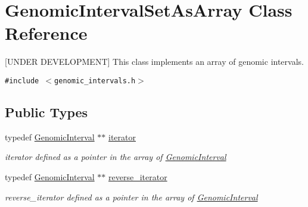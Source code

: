 \hypertarget{classGenomicIntervalSetAsArray}{
\section{GenomicIntervalSetAsArray Class Reference}
\label{classGenomicIntervalSetAsArray}
}
\mbox{[}UNDER DEVELOPMENT\mbox{]} This class implements an array of genomic intervals.  


{\tt \#include $<$genomic\_\-intervals.h$>$}

\subsection*{Public Types}
\begin{CompactItemize}
\item 
\hypertarget{classGenomicIntervalSetAsArray_1a0416c9fac7e9d965ae7fe84f1649c2}{
typedef \hyperlink{classGenomicInterval}{GenomicInterval} $\ast$$\ast$ \hyperlink{classGenomicIntervalSetAsArray_1a0416c9fac7e9d965ae7fe84f1649c2}{iterator}}
\label{classGenomicIntervalSetAsArray_1a0416c9fac7e9d965ae7fe84f1649c2}

\begin{CompactList}\small\item\em iterator defined as a pointer in the array of \hyperlink{classGenomicInterval}{GenomicInterval} \item\end{CompactList}\item 
\hypertarget{classGenomicIntervalSetAsArray_0310f5d79c529b631a5ef71ef186b41c}{
typedef \hyperlink{classGenomicInterval}{GenomicInterval} $\ast$$\ast$ \hyperlink{classGenomicIntervalSetAsArray_0310f5d79c529b631a5ef71ef186b41c}{reverse\_\-iterator}}
\label{classGenomicIntervalSetAsArray_0310f5d79c529b631a5ef71ef186b41c}

\begin{CompactList}\small\item\em reverse\_\-iterator defined as a pointer in the array of \hyperlink{classGenomicInterval}{GenomicInterval} \item\end{CompactList}\end{CompactItemize}
